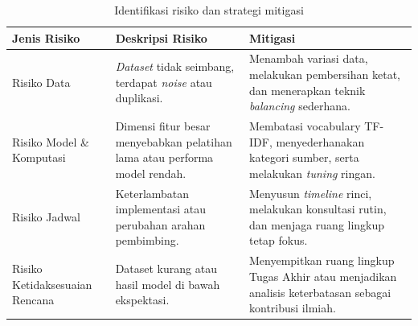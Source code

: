 \begin{table}[h!]
\centering
\begin{tabular}{| p{} | p{} | p{} |}
\hline
\textbf{Jenis Risiko} 
& \textbf{Deskripsi Risiko} 
& \textbf{Mitigasi} \\
\hline

Risiko Data
& \textit{Dataset} tidak seimbang, terdapat \textit{noise} atau duplikasi.
& Menambah variasi data, melakukan pembersihan ketat, dan menerapkan teknik \textit{balancing} sederhana. \\
\hline

Risiko Model \& Komputasi
& Dimensi fitur besar menyebabkan pelatihan lama atau performa model rendah.
& Membatasi vocabulary TF-IDF, menyederhanakan kategori sumber, serta melakukan \textit{tuning} ringan. \\
\hline

Risiko Jadwal
& Keterlambatan implementasi atau perubahan arahan pembimbing.
& Menyusun \textit{timeline} rinci, melakukan konsultasi rutin, dan menjaga ruang lingkup tetap fokus. \\
\hline

Risiko Ketidaksesuaian Rencana
& Dataset kurang atau hasil model di bawah ekspektasi.
& Menyempitkan ruang lingkup Tugas Akhir atau menjadikan analisis keterbatasan sebagai kontribusi ilmiah. \\
\hline

\end{tabular}
\caption{Identifikasi risiko dan strategi mitigasi}
\label{tbl:risiko-mitigasi}
\end{table}
